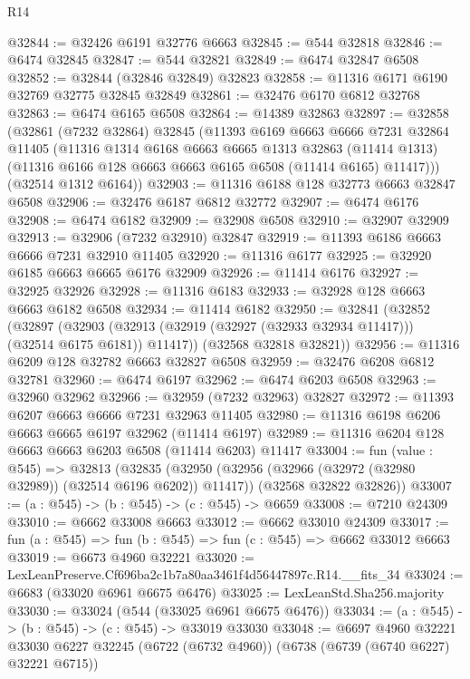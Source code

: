 \begin{lexlean}{R14}
\begin{coremodule}
@32844 := @32426 @6191 @32776 @6663
@32845 := @544 @32818
@32846 := @6474 @32845
@32847 := @544 @32821
@32849 := @6474 @32847 @6508
@32852 := @32844 (@32846 @32849) @32823
@32858 := @11316 @6171 @6190 @32769 @32775 @32845 @32849
@32861 := @32476 @6170 @6812 @32768
@32863 := @6474 @6165 @6508
@32864 := @14389 @32863
@32897 := @32858
    (@32861
      (@7232 @32864)
      @32845
      (@11393
        @6169
        @6663
        @6666
        @7231
        @32864
        @11405
        (@11316
          @1314
          @6168
          @6663
          @6665
          @1313
          @32863
          (@11414 @1313)
          (@11316 @6166 @128 @6663 @6663 @6165 @6508 (@11414 @6165) @11417)))
      (@32514 @1312 @6164))
@32903 := @11316 @6188 @128 @32773 @6663 @32847 @6508
@32906 := @32476 @6187 @6812 @32772
@32907 := @6474 @6176
@32908 := @6474 @6182
@32909 := @32908 @6508
@32910 := @32907 @32909
@32913 := @32906 (@7232 @32910) @32847
@32919 := @11393 @6186 @6663 @6666 @7231 @32910 @11405
@32920 := @11316 @6177
@32925 := @32920 @6185 @6663 @6665 @6176 @32909
@32926 := @11414 @6176
@32927 := @32925 @32926
@32928 := @11316 @6183
@32933 := @32928 @128 @6663 @6663 @6182 @6508
@32934 := @11414 @6182
@32950 := @32841
    (@32852
      (@32897
        (@32903 (@32913 (@32919 (@32927 (@32933 @32934 @11417))) (@32514 @6175 @6181)) @11417))
      (@32568 @32818 @32821))
@32956 := @11316 @6209 @128 @32782 @6663 @32827 @6508
@32959 := @32476 @6208 @6812 @32781
@32960 := @6474 @6197
@32962 := @6474 @6203 @6508
@32963 := @32960 @32962
@32966 := @32959 (@7232 @32963) @32827
@32972 := @11393 @6207 @6663 @6666 @7231 @32963 @11405
@32980 := @11316 @6198 @6206 @6663 @6665 @6197 @32962 (@11414 @6197)
@32989 := @11316 @6204 @128 @6663 @6663 @6203 @6508 (@11414 @6203) @11417
@33004 := fun (value : @545) =>
  @32813
    (@32835
      (@32950 (@32956 (@32966 (@32972 (@32980 @32989)) (@32514 @6196 @6202)) @11417))
      (@32568 @32822 @32826))
@33007 := (a : @545) -> (b : @545) -> (c : @545) -> @6659
@33008 := @7210 @24309
@33010 := @6662 @33008 @6663
@33012 := @6662 @33010 @24309
@33017 := fun (a : @545) => fun (b : @545) => fun (c : @545) => @6662 @33012 @6663
@33019 := @6673 @4960 @32221
@33020 := LexLeanPreserve.Cf696ba2c1b7a80aa3461f4d56447897c.R14.__fits_34
@33024 := @6683 (@33020 @6961 @6675 @6476)
@33025 := LexLeanStd.Sha256.majority
@33030 := @33024 (@544 (@33025 @6961 @6675 @6476))
@33034 := (a : @545) -> (b : @545) -> (c : @545) -> @33019 @33030
@33048 := @6697
    @4960
    @32221
    @33030
    @6227
    @32245
    (@6722 (@6732 @4960))
    (@6738 (@6739 (@6740 @6227) @32221 @6715))

\end{coremodule}
\end{lexlean}
